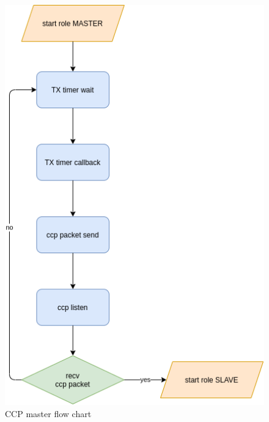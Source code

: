 \documentclass[\main/main.tex]{subfiles}
\begin{document}
\begin{figure}[H]
    \begin{center}
        \includegraphics[scale=0.6]{ccp_master_flow_chart.png}
    \end{center}
    \caption{CCP master flow chart}
    \label{fig:ccp_master_flow_chart}
\end{figure}
\end{document}
